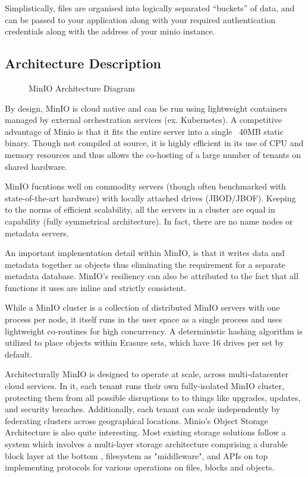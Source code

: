 \documentclass{article}
\begin{document}
Simplistically, files are organised into logically separated “buckets” of data, and can be passed to your application along with your required authentication credentials along with the address of your minio instance.

\subsection{Architecture Description}
\begin{figure}
    \centering
    \caption{MinIO Architecture Diagram}
    \label{fig: minio}
\end{figure}

By design, MinIO is cloud native and can be run using lightweight containers managed by external orchestration services (ex. Kubernetes). A competitive advantage of Minio is that it fits the entire server into a single ~40MB static binary. Though not compiled at source, it is highly efficient in its use of CPU and memory resources and thus allows the co-hosting of a large number of tenants on shared hardware.

MinIO fucntions well on commodity servers (though often benchmarked with state-of-the-art hardware) with locally attached drives (JBOD/JBOF). Keeping to the norms of efficient scalability, all the servers in a cluster are equal in capability (fully symmetrical architecture). In fact, there are no name nodes or metadata servers.

An important implenentation detail within MinIO, is that it writes data and metadata together as objects thus eliminating the requirement for a separate metadata database. MinIO's resiliency can also be attributed to the fact that all functions it uses are inline and strictly consistent. 

While a MinIO cluster is a collection of distributed MinIO servers with one process per node, it itself runs in the user space as a single process and uses lightweight co-routines for high concurrency. A deterministic hashing algorithm is utilized to place objects within Erasure sets, which have 16 drives per set by default.

Architecturally MinIO is designed to operate at scale, across multi-datacenter cloud services. In it, each tenant runs their own fully-isolated MinIO cluster, protecting them from all possible disruptions to to things like upgrades, updates, and security breaches. Additionally, each tenant can scale independently by federating clusters across geographical locations. Minio's Object Storage Architecture is also quite interesting. Most existing storage solutions follow a system which involves a multi-layer storage architecture comprising a durable block layer at the bottom , filesystem as "middleware", and APIs on top implementing protocols for various operations on files, blocks and objects.
\end{document}
